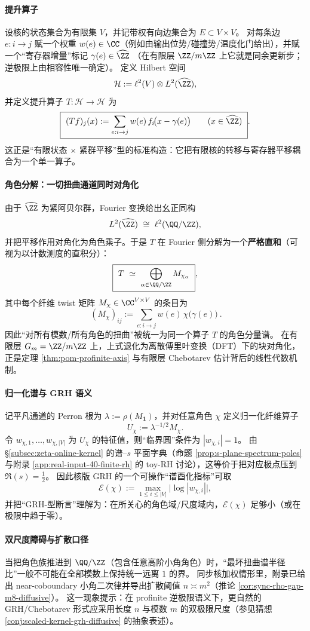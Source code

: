 \paragraph{提升算子}
设核的状态集合为有限集 \(V\)，并记带权有向边集合为 \(E\subset V\times V\)。
对每条边 \(e:i\to j\) 赋一个权重 \(w(e)\in\CC\)（例如由输出位势/碰撞势/温度化门给出），并赋一个“寄存器增量”标记
\(\gamma(e)\in \widehat{\ZZ}\)
（在有限层 \(\ZZ/m\ZZ\) 上它就是同余更新步；逆极限上由相容性唯一确定）。
定义 Hilbert 空间
\[
\mathcal{H}:=\ell^2(V)\otimes L^2(\widehat{\ZZ}),
\]
并定义提升算子 \(T:\mathcal{H}\to\mathcal{H}\) 为
\[
\boxed{\ (Tf)_j(x):=\sum_{e:i\to j} w(e)\,f_i\!\bigl(x-\gamma(e)\bigr)\qquad(x\in\widehat{\ZZ})\ }.
\]
这正是“有限状态 \(\times\) 紧群平移”型的标准构造：它把有限核的转移与寄存器平移耦合为一个单一算子。

\paragraph{角色分解：一切扭曲通道同时对角化}
由于 \(\widehat{\ZZ}\) 为紧阿贝尔群，Fourier 变换给出幺正同构
\[
L^2(\widehat{\ZZ})\ \cong\ \ell^2(\QQ/\ZZ),
\]
并把平移作用对角化为角色乘子。于是 \(T\) 在 Fourier 侧分解为一个\textbf{严格直和}（可视为以计数测度的直积分）：
\[
\boxed{\ T\ \simeq\ \bigoplus_{\alpha\in\QQ/\ZZ} M_{\chi_\alpha}\ },
\]
其中每个纤维 twist 矩阵 \(M_{\chi}\in\CC^{V\times V}\) 的条目为
\[
\boxed{\ (M_\chi)_{ij}:=\sum_{e:i\to j} w(e)\,\chi\!\bigl(\gamma(e)\bigr)\ }.
\]
因此“对所有模数/所有角色的扭曲”被统一为同一个算子 \(T\) 的角色分量谱。
在有限层 \(G_m=\ZZ/m\ZZ\) 上，上式退化为离散傅里叶变换（DFT）下的块对角化，正是定理 \ref{thm:pom-profinite-axis} 与有限层 Chebotarev 估计背后的线性代数机制。

\paragraph{归一化谱与 GRH 语义}
记平凡通道的 Perron 根为 \(\lambda:=\rho(M_{\mathbf{1}})\)，并对任意角色 \(\chi\) 定义归一化纤维算子
\[
U_\chi:=\lambda^{-1/2}M_\chi.
\]
令 \(w_{\chi,1},\dots,w_{\chi,|V|}\) 为 \(U_\chi\) 的特征值，则“临界圆”条件为 \(|w_{\chi,i}|=1\)。
由 \S\ref{subsec:zeta-online-kernel} 的谱--\(s\) 平面字典（命题 \ref{prop:s-plane-spectrum-poles} 与附录 \ref{app:real-input-40-finite-rh} 的 toy-RH 讨论），这等价于把对应极点压到 \(\Re(s)=\tfrac12\)。
因此核版 GRH 的一个可操作“谱酉化指标”可取
\[
\mathcal{E}(\chi):=\max_{1\le i\le |V|}\bigl|\log|w_{\chi,i}|\bigr|,
\]
并把“GRH-型断言”理解为：在所关心的角色域/尺度域内，\(\mathcal{E}(\chi)\) 足够小（或在极限中趋于零）。

\paragraph{双尺度障碍与扩散口径}
当把角色族推进到 \(\QQ/\ZZ\)（包含任意高阶小角角色）时，“最坏扭曲谱半径比”一般不可能在全部模数上保持统一远离 \(1\) 的界。
同步核加权情形里，附录已给出 near-coboundary 小角二次律并导出扩散阈值 \(n\asymp m^2\)（推论 \ref{cor:sync-rho-gap-m8-diffusive}）。
这一现象提示：在 profinite 逆极限语义下，更自然的 GRH/Chebotarev 形式应采用长度 \(n\) 与模数 \(m\) 的双极限尺度（参见猜想 \ref{conj:scaled-kernel-grh-diffusive} 的抽象表述）。
